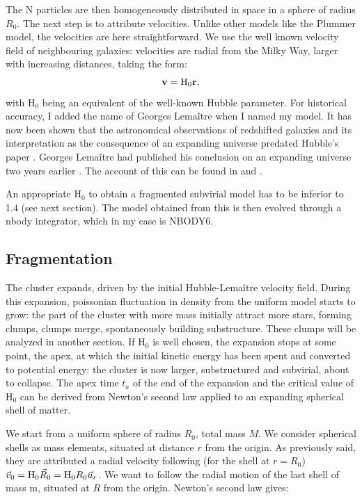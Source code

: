 The N particles are then homogeneously distributed in space in a sphere of radius $R_0$. The next step is to attribute velocities. Unlike other models like the Plummer model, the velocities are here straightforward. We use the well known velocity field of neighbouring galaxies: velocities are radial from the Milky Way, larger with increasing distances, taking the form:
\begin{equation}
\bold{v} =  \textrm{H}_0 \bold{r},
\end{equation}
with H$_0$ being an equivalent of the well-known Hubble parameter. For historical accuracy, I added the name of Georges Lema\^itre when I named my model. It has now been shown that the astronomical observations of redshifted galaxies and its interpretation as the consequence of an expanding universe predated Hubble's paper \citep{Hubble1929}. Georges Lema\^itre had published his conclusion on an expanding universe two years earlier \citep{Lemaitre1927}. The account of this can be found in \cite{Kragh2003,VanDenBergh2011} and \cite{Freeman2015}.

An appropriate H$_0$ to obtain a fragmented subvirial model has to be inferior to 1.4 (see next section). The model obtained from this is then evolved through a nbody integrator, which in my case is NBODY6.


\subsection{Fragmentation}

The cluster expands, driven by the initial Hubble-Lema\^itre velocity field. During this expansion, poissonian fluctuation in density from the uniform model starts to grow: the part of the cluster with more mass initially attract more stars, forming clumps, clumps merge, spontaneously building substructure. These clumps will be analyzed in another section. If H$_0$ is well chosen, the expansion stops at some point, the apex, at which the initial kinetic energy has been spent and converted to potential energy: the cluster is now larger, substructured and subvirial, about to collapse. The apex time $t_a$ of the end of the expansion and the critical value of H$_0$ can be derived from Newton's second law applied to an expanding spherical shell of matter.

We start from a uniform sphere of radius $R_0$, total mass $M$. We consider spherical shells as mass elements, situated at distance $r$ from the origin. As previously said, they are attributed a radial velocity following (for the shell at $r=R_0$) $\vec v_0 = {\textrm{H}}_0 \vec R_0 = {\textrm{H}}_0 R_0 \vec u_r$. We want to follow the radial motion of the last shell of mass m, situated at $R$ from the origin. Newton's second law gives:


